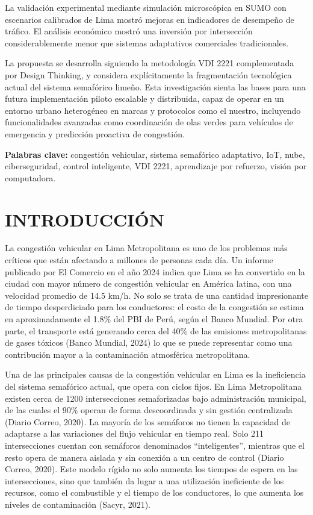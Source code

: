 \documentclass[12pt,a4paper,oneside]{report}
\begin{document}
La validación experimental mediante simulación microscópica en SUMO con escenarios calibrados de Lima mostró mejoras en indicadores de desempeño de tráfico. El análisis económico mostró una inversión por intersección considerablemente menor que sistemas adaptativos comerciales tradicionales.

La propuesta se desarrolla siguiendo la metodología VDI 2221 complementada por Design Thinking, y considera explícitamente la fragmentación tecnológica actual del sistema semafórico limeño. Esta investigación sienta las bases para una futura implementación piloto escalable y distribuida, capaz de operar en un entorno urbano heterogéneo en marcas y protocolos como el nuestro, incluyendo funcionalidades avanzadas como coordinación de olas verdes para vehículos de emergencia y predicción proactiva de congestión.

\textbf{Palabras clave:} congestión vehicular, sistema semafórico adaptativo, IoT, nube, ciberseguridad, control inteligente, VDI 2221, aprendizaje por refuerzo, visión por computadora.

\cleardoublepage
{}
\tableofcontents
\cleardoublepage
{}
\listoffigures
\cleardoublepage
{}
\listoftables
\cleardoublepage
{}
\chapter*{INTRODUCCIÓN}\label{introducciuxf3n}

La congestión vehicular en Lima Metropolitana es uno de los problemas más críticos que están afectando a millones de personas cada día. Un informe publicado por El Comercio en el año 2024 indica que Lima se ha convertido en la ciudad con mayor número de congestión vehicular en América latina, con una velocidad promedio de 14.5 km/h. No solo se trata de una cantidad impresionante de tiempo desperdiciado para los conductores: el costo de la congestión se estima en aproximadamente el 1.8\% del PBI de Perú, según el Banco Mundial. Por otra parte, el transporte está generando cerca del 40\% de las emisiones metropolitanas de gases tóxicos (Banco Mundial, 2024) lo que se puede representar como una contribución mayor a la contaminación atmosférica metropolitana.

Una de las principales causas de la congestión vehicular en Lima es la ineficiencia del sistema semafórico actual, que opera con ciclos fijos. En Lima Metropolitana existen cerca de 1200 intersecciones semaforizadas bajo administración municipal, de las cuales el 90\% operan de forma descoordinada y sin gestión centralizada (Diario Correo, 2020). La mayoría de los semáforos no tienen la capacidad de adaptarse a las variaciones del flujo vehicular en tiempo real. Solo 211 intersecciones cuentan con semáforos denominados ``inteligentes'', mientras que el resto opera de manera aislada y sin conexión a un centro de control (Diario Correo, 2020). Este modelo rígido no solo aumenta los tiempos de espera en las intersecciones, sino que también da lugar a una utilización ineficiente de los recursos, como el combustible y el tiempo de los conductores, lo que aumenta los niveles de contaminación (Sacyr, 2021).
\end{document}
